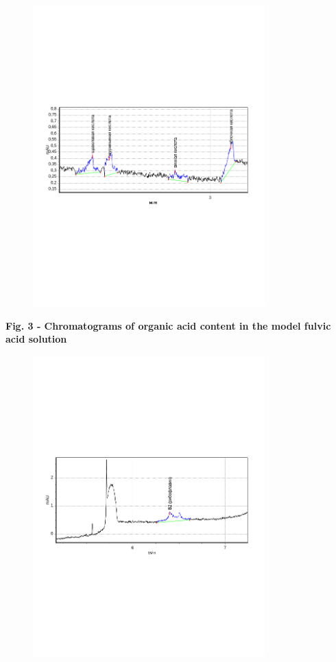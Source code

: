 \begin{figure}[H]
	\centering
	\includegraphics[width=0.8\textwidth]{media/chem/image6}
	\caption*{}
\end{figure}


{\bfseries Fig. 3 - Chromatograms of organic acid content in the model
fulvic acid solution}

\begin{figure}[H]
	\centering
	\includegraphics[width=0.8\textwidth]{media/chem/image7}
	\caption*{}
\end{figure}


